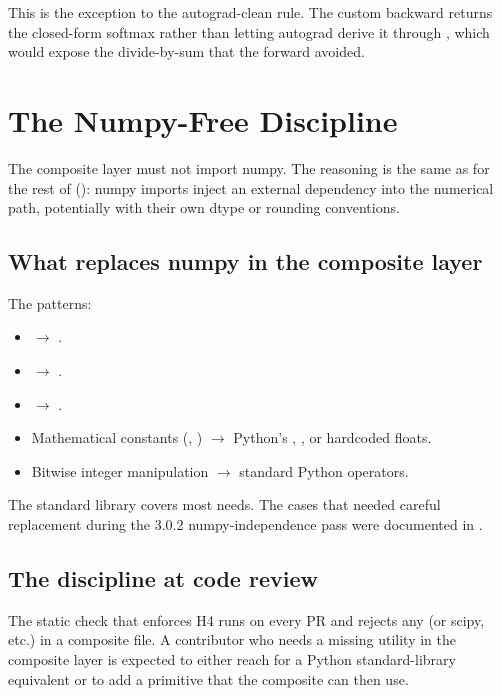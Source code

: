 This is the exception to the autograd-clean rule. The custom
backward returns the closed-form softmax rather than letting
autograd derive it through , which would expose the
divide-by-sum that the forward avoided.

\section{The Numpy-Free Discipline}
\label{sec:composite_ops:numpy_free}

The composite layer must not import numpy. The reasoning is the
same as for the rest of 
(): numpy imports inject an external
dependency into the numerical path, potentially with their own
dtype or rounding conventions.

\subsection{What replaces numpy in the composite layer}
\label{ssec:composite_ops:replace_numpy}

The patterns:

\begin{itemize}
  \item {} $\to$ .
  \item {} $\to$
    .
  \item {} $\to$ .
  \item Mathematical constants (, ) $\to$
    Python's , , or hardcoded floats.
  \item Bitwise integer manipulation $\to$ standard Python
    operators.
\end{itemize}

The standard library covers most needs. The cases that needed
careful replacement during the 3.0.2 numpy-independence pass were
documented in .

\subsection{The discipline at code review}
\label{ssec:composite_ops:review_discipline}

The static check that enforces H4 runs on every PR and rejects any
 (or scipy, etc.) in a composite file. A
contributor who needs a missing utility in the composite layer is
expected to either reach for a Python standard-library equivalent
or to add a primitive that the composite can then use.

